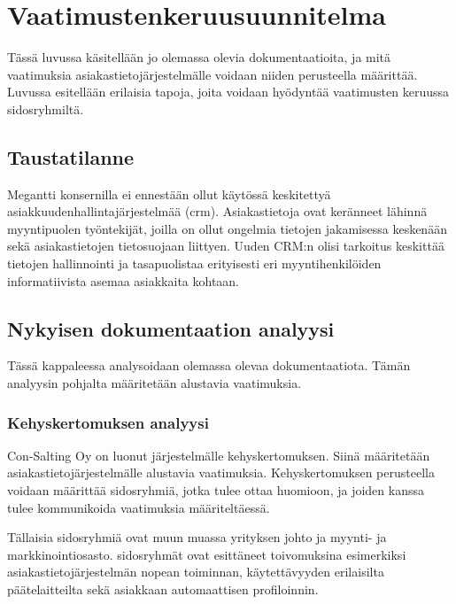 \chapter{Vaatimustenkeruusuunnitelma} %
\label{keruu} %
\thispagestyle{fancy} %

Tässä luvussa käsitellään jo olemassa olevia dokumentaatioita, ja mitä vaatimuksia asiakastietojärjestelmälle voidaan niiden perusteella määrittää. Luvussa esitellään erilaisia tapoja, joita voidaan hyödyntää vaatimusten keruussa sidosryhmiltä.

\section{Taustatilanne}

Megantti konsernilla ei ennestään ollut käytössä keskitettyä asiakkuudenhallintajärjestelmää (\acrshort{crm}).
Asiakastietoja ovat keränneet lähinnä myyntipuolen työntekijät, joilla on ollut ongelmia tietojen jakamisessa keskenään sekä asiakastietojen tietosuojaan liittyen. Uuden CRM:n olisi tarkoitus keskittää tietojen hallinnointi ja tasapuolistaa erityisesti eri myyntihenkilöiden informatiivista asemaa asiakkaita kohtaan.

\section{Nykyisen dokumentaation analyysi}
Tässä kappaleessa analysoidaan olemassa olevaa dokumentaatiota. Tämän analyysin pohjalta määritetään alustavia vaatimuksia.


    \subsection{Kehyskertomuksen analyysi}
    Con-Salting Oy on luonut järjestelmälle kehyskertomuksen. Siinä määritetään asiakastietojärjestelmälle alustavia vaatimuksia. Kehyskertomuksen perusteella voidaan määrittää sidosryhmiä, jotka tulee ottaa huomioon, ja joiden kanssa tulee kommunikoida vaatimuksia määriteltäessä.

    Tällaisia sidosryhmiä ovat muun muassa yrityksen johto ja myynti- ja markkinointiosasto.
    sidosryhmät ovat esittäneet toivomuksina esimerkiksi asiakastietojärjestelmän nopean toiminnan, käytettävyyden erilaisilta päätelaitteilta sekä asiakkaan 
    automaattisen profiloinnin. 
        
